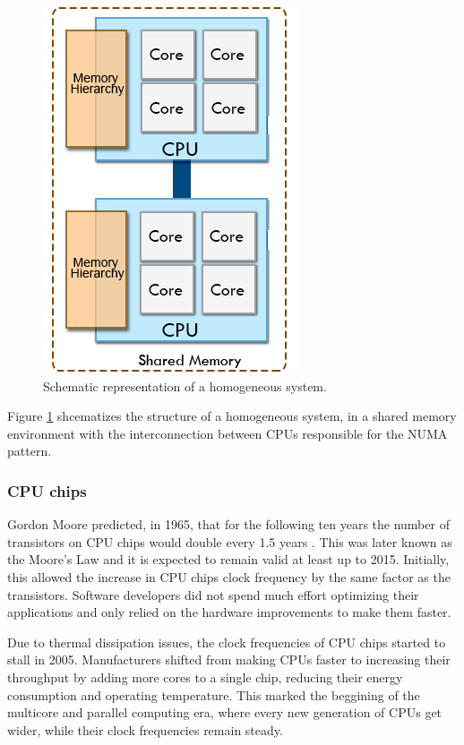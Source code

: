 \begin{figure}[!htp]
	\begin{center}
		\includegraphics[scale=0.4]{../../common/img/homoplats.png}
		\caption{Schematic representation of a homogeneous system.}
		\label{fig:HomogeneousSystem}
	\end{center}
\end{figure}

Figure \ref{fig:HomogeneousSystem} shcematizes the structure of a homogeneous system, in a shared memory environment with the interconnection between CPUs responsible for the NUMA pattern.

\subsubsection*{CPU chips}
\label{CPUChips}

Gordon Moore predicted, in 1965, that for the following ten years the number of transistors on CPU chips would double every 1.5 years \cite{MooreLaw}. This was later known as the Moore's Law and it is expected to remain valid at least up to 2015. Initially, this allowed the increase in CPU chips clock frequency by the same factor as the transistors. Software developers did not spend much effort optimizing their applications and only relied on the hardware improvements to make them faster.

Due to thermal dissipation issues, the clock frequencies of CPU chips started to stall in 2005. Manufacturers shifted from making CPUs faster to increasing their throughput by adding more cores to a single chip, reducing their energy consumption and operating temperature. This marked the beggining of the multicore and parallel computing era, where every new generation of CPUs get wider, while their clock frequencies remain steady.


